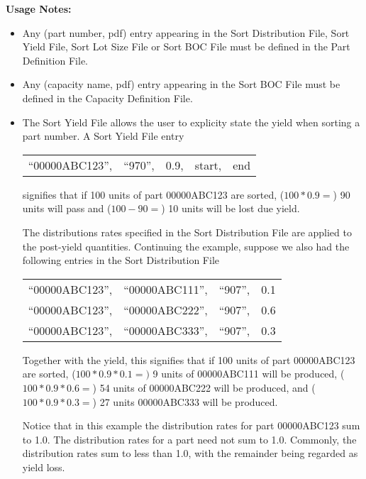\vspace{.5in}

\noindent
{\bf Usage Notes:}
\begin{itemize}
\item Any (part number, pdf) entry appearing in the Sort
Distribution File, Sort Yield File, Sort Lot Size File or Sort BOC 
File must be defined in the Part Definition File.
\item Any (capacity name, pdf) entry appearing in the Sort BOC
File must be defined in the Capacity Definition File.
\item The Sort Yield File allows the user to explicity state the yield
when sorting a part number. A Sort Yield File entry
 \begin{center}
\begin{tabular}{lllll}
  ``00000ABC123'', &``970'', &0.9, &start, &end
\end{tabular}
\end{center}
signifies that if 100 units of part 00000ABC123 are sorted, ($100*0.9=$)
90 units will pass and ($100-90=$) 10 units will be lost due yield.

The distributions rates specified in the Sort Distribution File are
applied to the post-yield quantities. Continuing the example, suppose we
also had the following entries in the Sort Distribution File
\begin{center}
\begin{tabular}{llll}
  ``00000ABC123'', &``00000ABC111'', &``907'', &0.1 \\
  ``00000ABC123'', &``00000ABC222'', &``907'', &0.6 \\
  ``00000ABC123'', &``00000ABC333'', &``907'', &0.3
\end{tabular}
\end{center}
Together with the yield, this signifies that if 100 units of part
00000ABC123 are sorted, ($100*0.9*0.1=)$ 9 units of 00000ABC111 will be
produced, ($100*0.9*0.6=$) 54 units of 00000ABC222 will be produced, and
($100*0.9*0.3=$) 27 units 00000ABC333 will be produced. 

Notice that in this example the distribution rates for
part 00000ABC123 sum to 1.0. The distribution rates for a part need
not sum to 1.0. Commonly, the distribution rates sum to less than
1.0, with the remainder being regarded as yield loss.


\end{itemize}
